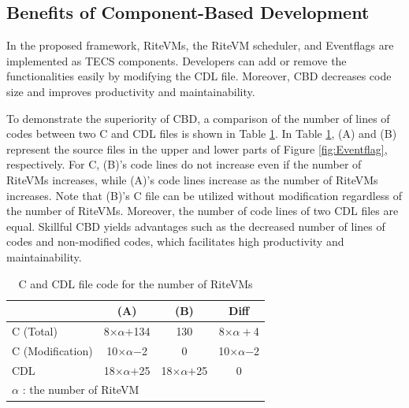 \documentclass[conference]{IEEEtran/IEEEtran/IEEEtran}
\begin{document}
\subsection{Benefits of Component-Based Development}
In the proposed framework, RiteVMs, the RiteVM scheduler, and Eventflags are implemented as TECS components.
Developers can add or remove the functionalities easily by modifying the CDL file.
Moreover, CBD decreases code size and improves productivity and maintainability.

To demonstrate the superiority of CBD, a comparison of the number of lines of codes between two C and CDL files is shown in Table \ref{tab:codesize}.
In Table \ref{tab:codesize}, (A) and (B) represent the source files in the upper and lower parts of Figure \ref{fig:Eventflag}, respectively. 
For C, (B)'s code lines do not increase even if the number of RiteVMs increases, while (A)'s code lines increase as the number of RiteVMs increases.
Note that (B)'s C file can be utilized without modification regardless of the number of RiteVMs.
Moreover, the number of code lines of two CDL files are equal.
Skillful CBD yields advantages such as the decreased number of lines of codes and non-modified codes, which facilitates high productivity and maintainability.

\begin{table}[t]
    \centering
    \caption{C and CDL file code for the number of RiteVMs}
    \vspace{-2mm}
    {\tabcolsep=0.3cm
    \begin{tabular}{l||c|c|c}
                & (A)       & (B)     & Diff  \\ \hline
        C (Total)      & 8$\times$$\alpha$$+$134  & 130     & 8$\times$$\alpha+$4\\
        C (Modification)   & 10$\times\alpha$$-$2 & 0   &  10$\times\alpha$$-$2 \\
        CDL    & 18$\times$$\alpha$$+$25   & 18$\times$$\alpha$$+$25 & 0     \\
        \multicolumn{3}{l}{{\small $\alpha$} : {\scriptsize the number of RiteVM}}
    \end{tabular}
    }
          \vspace{-3mm}
    \label{tab:codesize}
\end{table}
\end{document}
